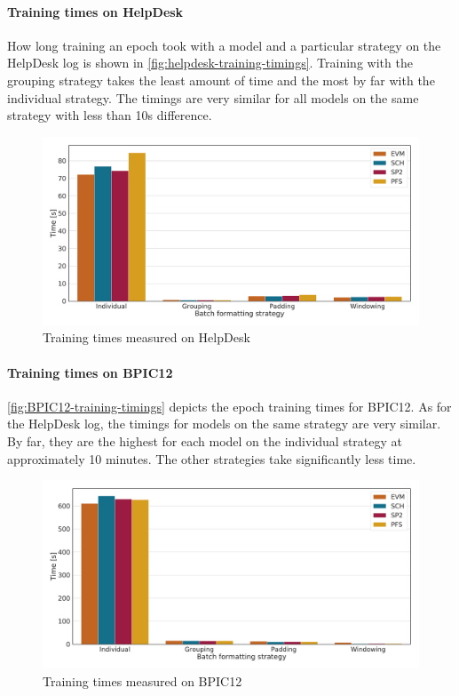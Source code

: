 \paragraph{Training times on HelpDesk}
How long training an epoch took with a model and a particular strategy on the HelpDesk log is shown in \autoref{fig:helpdesk-training-timings}.
Training with the grouping strategy takes the least amount of time and the most by far with the individual strategy.
The timings are very similar for all models on the same strategy with less than 10s difference.

\begin{figure}[!htb]
    \centering
    \includegraphics[width=\textwidth]{gfx/helpdesk/train_timings.pdf}
    \caption{Training times measured on HelpDesk}
    \label{fig:helpdesk-training-timings}
\end{figure}

\paragraph{Training times on BPIC12}
\autoref{fig:BPIC12-training-timings} depicts the epoch training times for BPIC12.
As for the HelpDesk log, the timings for models on the same strategy are very similar.
By far, they are the highest for each model on the individual strategy at approximately 10 minutes.
The other strategies take significantly less time.

\begin{figure}[!htb]
    \centering
    \includegraphics[width=\textwidth]{gfx/bpic2012/train_timings.pdf}
    \caption{Training times measured on BPIC12}
    \label{fig:BPIC12-training-timings}
\end{figure}

